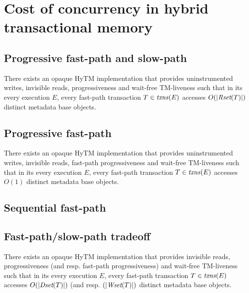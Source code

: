 \section{Cost of concurrency in hybrid transactional memory}
%
\subsection{Progressive fast-path and slow-path}
%

%
\begin{theorem}
\label{th:inswrite}
There exists an opaque HyTM implementation that provides uninstrumented writes, invisible reads, progressiveness
and wait-free TM-liveness such that
in its every execution $E$, every fast-path transaction $T\in \ms{txns}(E)$
accesses $O(|\textit{Rset}(T)|)$ distinct metadata base objects.
\end{theorem}
%
\subsection{Progressive fast-path}
%
\begin{theorem}
\label{th:inswrite2}
There exists an opaque HyTM implementation that provides uninstrumented writes, invisible reads, fast-path progressiveness
and wait-free TM-liveness such that
in its every execution $E$, every fast-path transaction $T\in \ms{txns}(E)$
accesses $O(1)$ distinct metadata base objects.
\end{theorem}


%
\subsection{Sequential fast-path}
%

%
\subsection{Fast-path/slow-path tradeoff}
%
\begin{theorem}
\label{th:write}
There exists an opaque HyTM implementation that provides invisible reads, progressiveness (and resp. fast-path progressiveness)
and wait-free TM-liveness such that
in its every execution $E$, every fast-path transaction $T\in \ms{txns}(E)$
accesses $O(|\textit{Dset}(T)|)$ (and resp. $(|\textit{Wset}(T)|)$ distinct metadata base objects.
\end{theorem}
%

